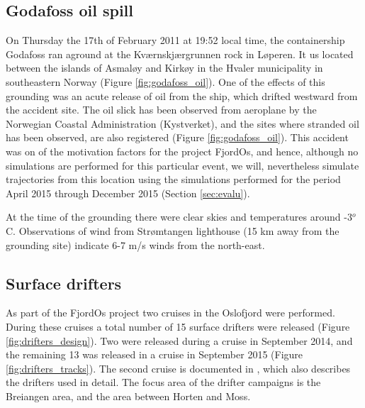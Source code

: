 \subsection{Godafoss oil spill}
\label{sect:godafoss_obs}
On Thursday the 17th of February 2011 at 19:52 local time, the containership Godafoss ran aground at the Kv{\ae}rnskj{\ae}rgrunnen rock in L{\o}peren. It us located between the islands of Asmal{\o}y and Kirk{\o}y in the Hvaler municipality in southeastern Norway (Figure \ref{fig:godafoss_oil}). One of the effects of this grounding was an acute release of oil from the ship, which drifted westward from the accident site. The oil slick has been observed from aeroplane by the Norwegian Coastal Administration (Kystverket), and the sites where stranded oil has been observed, are also registered (Figure \ref{fig:godafoss_oil}). This accident was on of the motivation factors for the project FjordOs, and hence, although no simulations are performed for this particular event, we will, nevertheless simulate trajectories from this location using the simulations performed for the period April 2015 through December 2015 (Section \ref{sec:evalu}). 

At the time of the grounding there were clear skies and temperatures around -3$^o$C. Observations of wind from Str{\o}mtangen lighthouse (15 km away from the grounding site) indicate 6-7 m/s winds from the north-east.


\subsection{Surface drifters}
\label{subsec:drifto}
As part of the FjordOs project two cruises in the Oslofjord were performed. During these cruises a total number of 15 surface drifters were released (Figure \ref{fig:drifters_design}). Two were released during a cruise in September 2014, and the remaining 13 was released in a cruise in September 2015 (Figure \ref{fig:drifters_tracks}). The second cruise is documented in \cite{hjelm:etal:2016}, which also describes the drifters used in detail. The focus area of the drifter campaigns is the Breiangen area, and the area between Horten and Moss.



\clearpage

